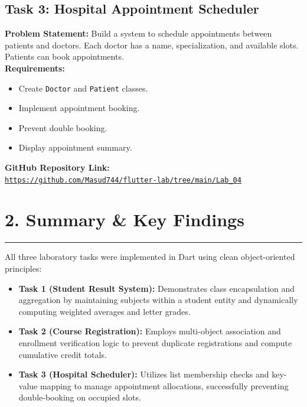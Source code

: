 \documentclass[11pt,a4paper]{article}
\begin{document}
\vspace{0.25cm}
\subsection*{Task 3: Hospital Appointment Scheduler}
\textbf{Problem Statement:} Build a system to schedule appointments between patients and doctors. Each doctor has a name, specialization, and available slots. Patients can book appointments.\\
\textbf{Requirements:}
\begin{itemize}
    \setlength{\itemsep}{2pt}
    \item Create \texttt{Doctor} and \texttt{Patient} classes.
    \item Implement appointment booking.
    \item Prevent double booking.
    \item Display appointment summary.
\end{itemize}

\vspace{0.3cm}
\noindent\textbf{GitHub Repository Link:}\\
\href{https://github.com/Masud744/flutter-lab/tree/main/Lab_04}{\texttt{https://github.com/Masud744/flutter-lab/tree/main/Lab\_04}}

\vspace{0.4cm}
\section*{2. Summary \& Key Findings}
\noindent\rule{\textwidth}{0.5pt}\vspace{0.15cm}
All three laboratory tasks were implemented in Dart using clean object-oriented principles:
\begin{itemize}
    \setlength{\itemsep}{4pt}
    \item \textbf{Task 1 (Student Result System):} Demonstrates class encapsulation and aggregation by maintaining subjects within a student entity and dynamically computing weighted averages and letter grades.
    \item \textbf{Task 2 (Course Registration):} Employs multi-object association and enrollment verification logic to prevent duplicate registrations and compute cumulative credit totals.
    \item \textbf{Task 3 (Hospital Scheduler):} Utilizes list membership checks and key-value mapping to manage appointment allocations, successfully preventing double-booking on occupied slots.
\end{itemize}
\end{document}
